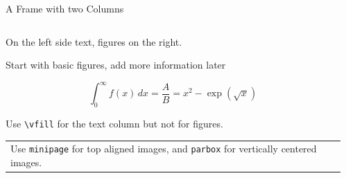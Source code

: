 
\begin{frame}{A Frame with two Columns}
  \begin{columns}
    \begin{column}{.45\textwidth}
      \minipage[c][0.65\textheight][s]{\columnwidth}
      
      On the left side text, figures on the right.

      \vfill


      Start with basic figures, add more information later

      \vfill
      \[\int_{0}^\infty f(x)\, dx = \frac{A}{B} = x^2 - \exp(\sqrt{x}) \]

      \vfill


      Use \texttt{\textbackslash vfill} for the text column but not
      for figures.
 
      \vfill
      
      \begin{tabular}{|p{}}
        Use \texttt{minipage} for top aligned images, and
        \texttt{parbox} for vertically centered images.
      \end{tabular}

      
      \endminipage      
    \end{column}
    \begin{column}{.55\textwidth}



      
    \end{column}
  \end{columns}

\end{frame}
